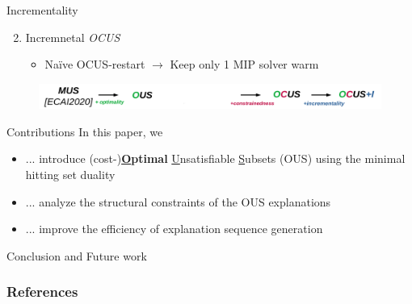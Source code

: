 \documentclass{beamer}
\begin{document}
\begin{frame}{Incrementality}
\begin{figure}
\end{figure}
\begin{enumerate}
	\setcounter{enumi}{1}
\item Incremnetal \emph{OCUS}	
\begin{itemize}
	\item Naïve OCUS-restart $\rightarrow$ Keep only 1 MIP solver warm
\end{itemize}	
\end{enumerate}
\begin{figure}
	\includegraphics[width=\textwidth]{mus_to_ocus_i.png}
\end{figure}
\end{frame}

\begin{frame}{Contributions}
    \vfill
    In this paper, we 
    \vfill
    \begin{itemize}
        \item ... introduce (cost-)\textbf{\underline{O}ptimal} \underline{U}nsatisfiable \underline{S}ubsets (OUS) using the minimal hitting set duality
        \item ... analyze the structural constraints of the OUS explanations
        \item ... improve the efficiency of explanation sequence generation
    \end{itemize}
    \vfill
\end{frame}


\begin{frame}{Conclusion and Future work}

\end{frame}

\begin{frame}[allowframebreaks]
	\frametitle{References}
	
	
\end{frame}
\end{document}
